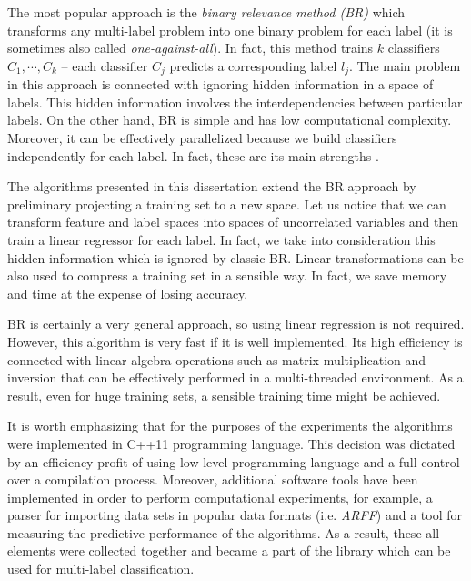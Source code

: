 The most popular approach is the \textit{binary relevance method (BR)} which transforms any multi-label problem into one binary problem for each label (it is sometimes also called \textit{one-against-all}). In fact, this method trains $k$ classifiers $C_1, \cdots, C_{k}$ -- each classifier $C_j$ predicts a corresponding label $l_j$.  The main problem in this approach is connected with ignoring hidden information in a space of labels. This hidden information involves the interdependencies between particular labels. On the other hand, BR is simple and has low computational complexity. Moreover, it can be effectively parallelized because we build classifiers independently for each label. In fact, these are its main strengths \citep{Chain}.

The algorithms presented in this dissertation extend the BR approach by preliminary projecting a training set to a new space. Let us notice that we can transform feature and label spaces into spaces of uncorrelated variables and then train a linear regressor for each label. In fact, we take into consideration this hidden information which is ignored by classic BR. Linear transformations can be also used to compress a training set in a sensible way. In fact, we save memory and time at the expense of losing accuracy. 

BR is certainly a very general approach, so using linear regression is not required. However, this algorithm is very fast if it is well implemented. Its high efficiency is connected with linear algebra operations such as matrix multiplication and inversion that can be effectively performed in a multi-threaded environment. As a result, even for huge training sets, a sensible training time might be achieved. 

It is worth emphasizing that for the purposes of the experiments the algorithms were implemented in C++11 programming language. This decision was dictated by an efficiency profit of using low-level programming language and a full control over a compilation process. Moreover, additional software tools have been implemented in order to perform computational experiments, for example, a parser for importing data sets in popular data formats (i.e. \textit{ARFF}) and a tool for measuring the predictive performance of the algorithms. As a result, these all elements were collected together and became a part of the library which can be used for multi-label classification.
